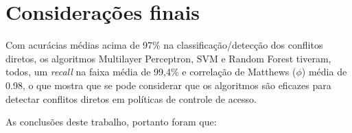 
\chapter{Considerações finais}\label{conclusoes}
Com  acurácias médias acima de 97\% na classificação/detecção dos conflitos diretos, os algoritmos Multilayer Perceptron, SVM e Random Forest tiveram, todos, um \textit{recall} na faixa média de 99,4\%  e correlação de Matthews ($\phi$) média de 0.98, o que mostra que se pode considerar que os algoritmos são eficazes para detectar conflitos diretos em políticas de controle de acesso. 

As conclusões deste trabalho, portanto foram que:

